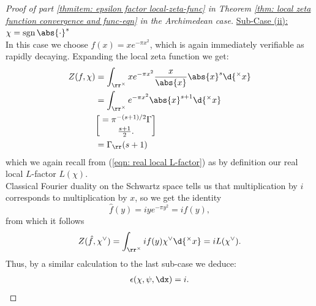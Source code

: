 \documentclass[11pt, x11names, openany]{book}
\begin{document}
\begin{proof}[Proof of part \ref{thmitem: epsilon factor local-zeta-func} in Theorem \ref{thm: local zeta function convergence and func-eqn} in the Archimedean case]
\underline{Sub-Case (ii): $\chi = \sgn \abs{\cdot}^s$}\\
In this case we choose $f(x) = xe^{-\pi x^2}$, which is again immediately verifiable as rapidly decaying. Expanding the local zeta function we get:
\begin{align*}
    Z(f, \chi) &= \int_{\rr^\times} x e^{-\pi x^2} \frac{x}{\abs{x}} \abs{x}^s \d{^\times x}\\
    &= \int_{\rr^\times} e^{-\pi x^2} \abs{x}^{s+1} \d{^\times x}\\
    &= \pi^{-(s+1)/2} \Gamma\brack{\frac{s+1}{2}}.\\
    &= \Gamma_\rr(s+1)
\end{align*}
which we again recall from (\ref{eqn: real local L-factor}) as by definition our real local $L$-factor $L(\chi)$.\\
Classical Fourier duality on the Schwartz space tells us that multiplication by $i$ corresponds to multiplication by $x$, so we get the identity
\begin{equation*}
    \hat{f}(y) = i y e^{- \pi y^2 } = i f(y),
\end{equation*} 
from which it follows 
\begin{equation*}
    Z(\hat{f}, \chi^\lor) = \int_{\rr^\times} i f(y) \chi^\lor \d{^\times x} = i L(\chi^\lor).
\end{equation*}
Thus, by a similar calculation to the last sub-case we deduce:
\begin{align}
\label{eqn: real epsilon factor 2}
    \epsilon(\chi, \psi, \dx) = i.
\end{align}


\end{proof}
\end{document}
